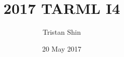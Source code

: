 \documentclass[a4paper, 12pt]{article}
\title{2017 TARML I4}
\author{Tristan Shin}
\date{20 May 2017}
\begin{document}
\maketitle



\hrulefill

\begin{solution}

\end{solution}
\end{document}
